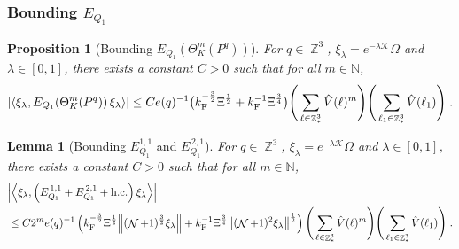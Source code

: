 \documentclass[12pt,a4paper]{article}
\numberwithin{equation}{section}
\newcommand{\cK}{\mathcal{K}}
\newcommand{\NNN}{\mathbb{N}}
\newcommand{\1}{\mathbb{I}}
\newcommand{\F}{\mathrm{F}}
\DeclareMathOperator{\Z}{\mathbb{Z}}
\DeclareMathOperator{\NN}{\mathcal{N}}
\newcommand{\half}{\frac{1}{2}}
\newcommand{\eva}[1]{\left\langle #1 \right\rangle}
\theoremstyle{plain}
\newtheorem{lemma}[theorem]{Lemma}
\newtheorem{proposition}[theorem]{Proposition}
\theoremstyle{definition}
\theoremstyle{remark}
\theoremstyle{plain}
\theoremstyle{definition}
\theoremstyle{remark}
\begin{document}
\subsubsection{Bounding $E_{Q_1}$}

\begin{proposition}[Bounding $E_{Q_1}(\Theta^m_{K}(P^q))$]\label{prop:finEQ1est}
For $ q \in \Z^3 $, $\xi_\lambda = e^{-\lambda \cK} \Omega$ and $ \lambda \in [0,1] $, there exists a constant $ C > 0 $ such that for all $ m \in \NNN $,
\begin{equation} \label{eq:finalEQ1est}
	\abs{\eva{\xi_\lambda, E_{Q_1}\!\left(\Theta^m_K(P^q)\right) \xi_\lambda}}
	\leq C e(q)^{-1} \big( k_{\F}^{-\frac{3}{2}} \Xi^\half + k_{\F}^{-1}\Xi^{\frac{3}{4}} \big)
		\Bigg(\sum\limits_{\ell \in \Z^3_*} \hat{V}(\ell)^m\Bigg)
		\Bigg( \sum\limits_{\ell_1 \in \Z^3_*} \hat{V}(\ell_1) \Bigg) \;.
\end{equation}
\end{proposition}





\begin{lemma}[Bounding $E_{Q_1}^{1,1}$ and $E^{\,2,1}_{Q_1}$]\label{lem:EQ111}
For $ q \in \Z^3 $, $\xi_\lambda = e^{-\lambda \cK} \Omega$ and $ \lambda \in [0,1] $, there exists a constant $ C > 0 $ such that for all $ m \in \NNN $,
\begin{equation} \label{eq:estEQ111}
\begin{aligned}
	&\abs{\eva{\xi_\lambda,\left(E^{\,1,1}_{Q_1}+E^{\,2,1}_{Q_1}+\mathrm{h.c.}\right) \xi_\lambda }} \\
	&\leq C 2^m e(q)^{-1} \left(
		k_{\F}^{-\frac{3}{2}} \Xi^\half \norm{ (\NN+1)^{\frac{3}{2}} \xi_\lambda }
		 + k_{\F}^{-1}\Xi^{\frac{3}{4}} \norm{ (\NN+1)^2\xi_\lambda}^\half \right) 
		\Bigg(\sum\limits_{\ell \in \Z^3_*} \hat{V}(\ell)^m\Bigg)\Bigg( \sum\limits_{\ell_1 \in \Z^3_*} \hat{V}(\ell_1) \Bigg) \;.
\end{aligned}
\end{equation}
\end{lemma}
\end{document}

